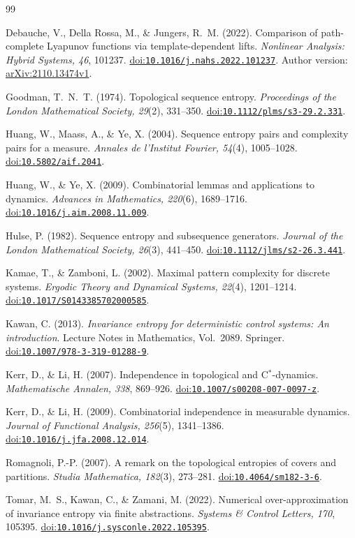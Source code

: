 \documentclass[11pt,reqno]{amsart}
\numberwithin{equation}{section}
\theoremstyle{definition}
\theoremstyle{definition}
\newcommand{\doi}[1]{\href{https://doi.org/#1}{doi:\nolinkurl{#1}}}
\begin{document}
\begin{thebibliography}{99}

Debauche, V., Della Rossa, M., \& Jungers, R.~M. (2022).
Comparison of path-complete Lyapunov functions via template-dependent lifts.
\emph{Nonlinear Analysis: Hybrid Systems, 46}, 101237.
\doi{10.1016/j.nahs.2022.101237}.
Author version: \href{https://arxiv.org/abs/2110.13474v1}{arXiv:2110.13474v1}.

Goodman, T.~N.~T. (1974). Topological sequence entropy.
\emph{Proceedings of the London Mathematical Society, 29}(2), 331--350.
\doi{10.1112/plms/s3-29.2.331}.

Huang, W., Maass, A., \& Ye, X. (2004).
Sequence entropy pairs and complexity pairs for a measure.
\emph{Annales de l'Institut Fourier, 54}(4), 1005--1028.
\doi{10.5802/aif.2041}.

Huang, W., \& Ye, X. (2009).
Combinatorial lemmas and applications to dynamics.
\emph{Advances in Mathematics, 220}(6), 1689--1716.
\doi{10.1016/j.aim.2008.11.009}.

Hulse, P. (1982). Sequence entropy and subsequence generators.
\emph{Journal of the London Mathematical Society, 26}(3), 441--450.
\doi{10.1112/jlms/s2-26.3.441}.

Kamae, T., \& Zamboni, L. (2002).
Maximal pattern complexity for discrete systems.
\emph{Ergodic Theory and Dynamical Systems, 22}(4), 1201--1214.
\doi{10.1017/S0143385702000585}.

Kawan, C. (2013).
\emph{Invariance entropy for deterministic control systems:
An introduction}. Lecture Notes in Mathematics, Vol.~2089.
Springer. \doi{10.1007/978-3-319-01288-9}.

Kerr, D., \& Li, H. (2007).
Independence in topological and C$^*$-dynamics.
\emph{Mathematische Annalen, 338}, 869--926.
\doi{10.1007/s00208-007-0097-z}.

Kerr, D., \& Li, H. (2009).
Combinatorial independence in measurable dynamics.
\emph{Journal of Functional Analysis, 256}(5), 1341--1386.
\doi{10.1016/j.jfa.2008.12.014}.

Romagnoli, P.-P. (2007).
A remark on the topological entropies of covers and partitions.
\emph{Studia Mathematica, 182}(3), 273--281.
\doi{10.4064/sm182-3-6}.

Tomar, M.~S., Kawan, C., \& Zamani, M. (2022).
Numerical over-approximation of invariance entropy via finite abstractions.
\emph{Systems \& Control Letters, 170}, 105395.
\doi{10.1016/j.sysconle.2022.105395}.

\end{thebibliography}
\end{document}
